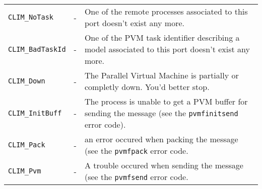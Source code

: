 \begin{description}
\begin{tabular}{l l p{10cm} }
      {\tt CLIM\_NoTask} & - & One of the remote processes associated to
this port doesn't exist any more. \\
      {\tt CLIM\_BadTaskId} & - & One of the PVM task identifier
describing a model associated to this port doesn't exist any more. \\
      {\tt CLIM\_Down} & - & The Parallel Virtual Machine is partially
or completly down. You'd better stop. \\
      {\tt CLIM\_InitBuff} & - & The process is unable to get a PVM
buffer for sending the message (see the {\tt pvmfinitsend} error code). \\
      {\tt CLIM\_Pack} & - & an error occured when packing the message
(see the {\tt pvmfpack} error code. \\
      {\tt CLIM\_Pvm} & - & A trouble occured when sending the message (see
the {\tt pvmfsend} error code. \\
    \end{tabular}
\end{description}
%
%
